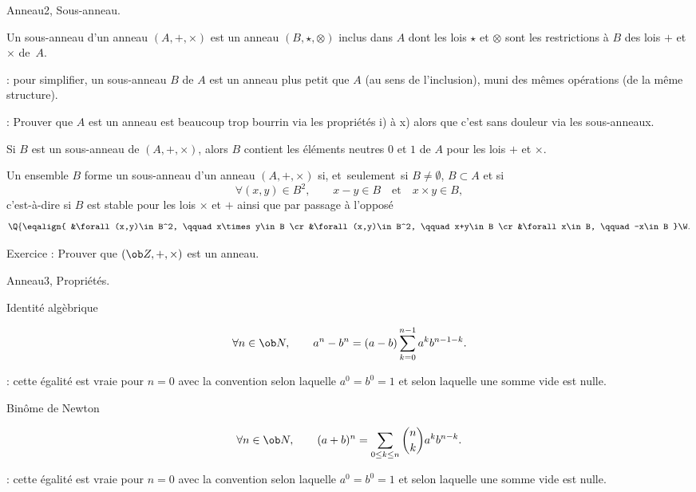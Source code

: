 \Subsection Anneau2, Sous-anneau. 

\Definition [] Un sous-anneau d'un anneau $(A,+,\times)$ est un anneau $(B, \star, \otimes)$ inclus dans $A$ dont les lois
$\star$ et $\otimes$ sont les restrictions à $B$ des lois $+$ et $\times$ de~$A$.  \bigskip

\Remarque : pour simplifier, un sous-anneau $B$ de $A$ est un anneau plus petit que $A$ (au sens de l'inclusion), muni des mêmes opérations (de la même structure). 
\bigskip

\Remarque : Prouver que $A$ est un anneau est beaucoup trop bourrin via les propriétés i) à x) alors que 
c'est sans douleur via les sous-anneaux. 
\bigskip

\Propriete []  Si $B$ est un sous-anneau de $(A,+,\times)$, alors $B$ contient les éléments neutres $0$ et $1$ de $A$ pour les lois $+$ et $\times$. 
\bigskip

\Propriete []  Un ensemble $B$ forme un sous-anneau d'un anneau $(A,+,\times)$ si, et~seulement~si
$B\neq\emptyset$, $B\subset A$ et si 
$$
\forall (x,y)\in B^2,\qquad x-y\in B\quad\mbox{et}\quad x\times y\in B, 
$$
c'est-à-dire si $B$ est stable pour les lois $\times$ et $+$ ainsi que par passage à l'opposé
$$
\Q\{
\eqalign{
&\forall (x,y)\in B^2, \qquad x\times y\in B
\cr
&\forall (x,y)\in B^2, \qquad x+y\in B
\cr
&\forall x\in B, \qquad -x\in B
}\W.
$$

Exercice :  Prouver que $(\ob Z, +,\times)$ est un anneau.     
\bigskip

\Subsection Anneau3, Propriétés. 

\Concept [] Identité algèbrique

\Theoreme [Title=Egalité fondamentale de l'algèbre;$a$ et $b$ éléments d'un anneau $(A,+,\times)$  vérifiant {$ab=ba$}] 
$$
\forall n\in\ob N, \qquad a^n-b^n=(a-b)\sum_{k=0}^{n-1}a^kb^{n-1-k}.
$$

\Remarque : cette égalité est vraie pour $n=0$ avec la convention selon laquelle $a^0=b^0=1$ et selon laquelle une somme vide est nulle. 
\bigskip


\Concept [] Binôme de Newton

\Theoreme [Title=Binôme de Newton;$a$ et $b$ éléments d'un anneau $(A,+,\times)$  vérifiant {$ab=ba$}]
$$
\forall n\in\ob N,\qquad (a+b)^n=\sum_{0\le k\le n}{n\choose k}a^kb^{n-k}.
$$

\Remarque : cette égalité est vraie pour $n=0$ avec la convention selon laquelle $a^0=b^0=1$ et selon laquelle une somme vide est nulle. 
\bigskip

